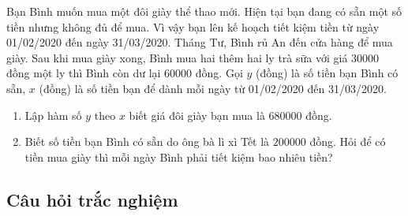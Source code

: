 \begin{bt}%
	Bạn Bình muốn mua một đôi giày thể thao mới. Hiện tại bạn đang có sẵn một số tiền nhưng không đủ để mua. Vì vậy bạn lên kế hoạch tiết kiệm tiền từ ngày 01/02/2020 đến ngày
	31/03/2020. Tháng Tư, Bình rủ An đến cửa hàng để mua giày. Sau khi mua giày xong, Bình mua hai thêm hai ly trà sữa với giá $30000$ đồng một ly thì Bình còn dư lại $60000$ đồng. Gọi $y$ (đồng) là số tiền bạn Bình có sẵn, $x$ (đồng) là số tiền bạn để dành mỗi ngày từ 01/02/2020 đến 31/03/2020.
	\begin{enumerate}
		\item Lập hàm số $y$ theo $x$ biết giá đôi giày bạn mua là $680000$ đồng.
		\item Biết số tiền bạn Bình có sẵn do ông bà lì xì Tết là $200000$ đồng. Hỏi để có tiền mua giày thì mỗi ngày Bình phải tiết kiệm bao nhiêu tiền?
	\end{enumerate}
\end{bt}


\subsection{Câu hỏi trắc nghiệm}

